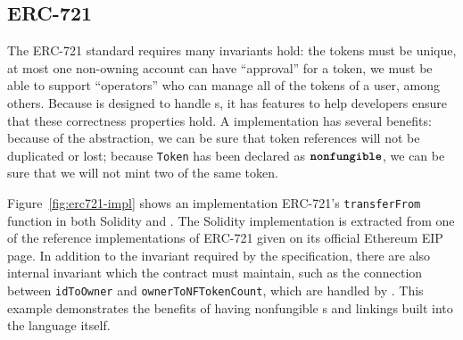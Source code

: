 \documentclass[sigconf]{acmart}
\begin{document}
\subsection{ERC-721}\label{sec:erc721-impl}
\begin{figure*}[h]
    \centering
    \begin{minipage}[t]{0.5\textwidth}
        
    \end{minipage}%
    \begin{minipage}[t]{0.5\textwidth}
        
    \end{minipage}
    \caption{A Solidity and a \langName implementation of the \lstinline{transferFrom} function of the ERC-721 standard.}
    \label{fig:erc721-impl}
\end{figure*}


The ERC-721 standard  requires many invariants hold:
    the tokens must be unique,
    at most one non-owning account can have ``approval'' for a token,
    we must be able to support ``operators'' who can manage all of the tokens of a user,
    among others.
Because \langName is designed to handle \assetTxt{}s, it has features to help developers ensure that these correctness properties hold.
A \langName implementation has several benefits: because of the \assetTxt abstraction, we can be sure that token references will not be duplicated or lost; because \lstinline{Token} has been declared as $\textbf{\texttt{nonfungible}}$, we can be sure that we will not mint two of the same token.

Figure~\ref{fig:erc721-impl} shows an implementation ERC-721's \lstinline{transferFrom} function in both Solidity and \langName.
The Solidity implementation is extracted from one of the reference implementations of ERC-721 given on its official Ethereum EIP page.
In addition to the invariant required by the specification, there are also internal invariant which the contract must maintain, such as the connection between \lstinline{idToOwner} and \lstinline{ownerToNFTokenCount}, which are handled by \langName.
This example demonstrates the benefits of having nonfungible \assetTxt{}s and linkings built into the language itself.
\end{document}
